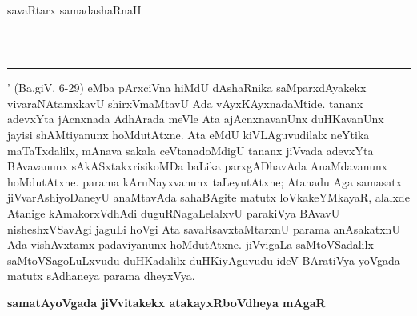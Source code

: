 savaRtarx sama\-dashaRnaH {\rm \rule{.029cm}{.2cm}}~{\rm \rule{.029cm}{.2cm}} ' (Ba.giV. {\rm 6-29}) eMba pArxciVna hiMdU dAshaRnika saMparxdAyakekx vivaraNAtamxkavU shirxVmaMtavU Ada vAyxKAyxnadaMtide. tananx adevxYta jAcnxnada AdhArada meVle Ata ajAcnxnavanUnx duHKavanUnx jayisi shAMti\-yanunx hoMdu\-tAtxne. Ata eMdU kiVLAguvudilalx neYtika maTaTxdalilx, mAnava sakala ceVtanadoMdigU tananx jiVvada adevxYta BAvavanunx sAkASxtakxrisikoMDa baLika parxgADha\-vAda AnaMdavanunx hoMdu\-tAtxne. parama kAruNayxvanunx taLeyutAtxne; Atanadu Aga samasatx jiVvarAshi\-yoDaneyU anaMtavAda sahaBAgite matutx loVkakeYMkayaR, alalxde Atanige kAma\-korxVdhAdi duguRNagaLelalxvU parakiVya BAvavU nisheshxVSavAgi jaguLi hoVgi Ata savaRsavxtaMtarxnU parama anA\-sakatxnU Ada vishAvxtamx padaviyanunx hoMdu\-tAtxne. jiVvi\-gaLa saMtoVSadalilx saMtoVSagoLuLxvudu duHKadalilx duHKiyAguvudu ideV BAra\-tiVya yoVgada matutx sAdhaneya parama dheyxVya.

\bigskip
\begin{center}
{\Large\bf samatAyoVgada jiVvitakekx atakayxRboVdheya mAgaR}
\end{center}

